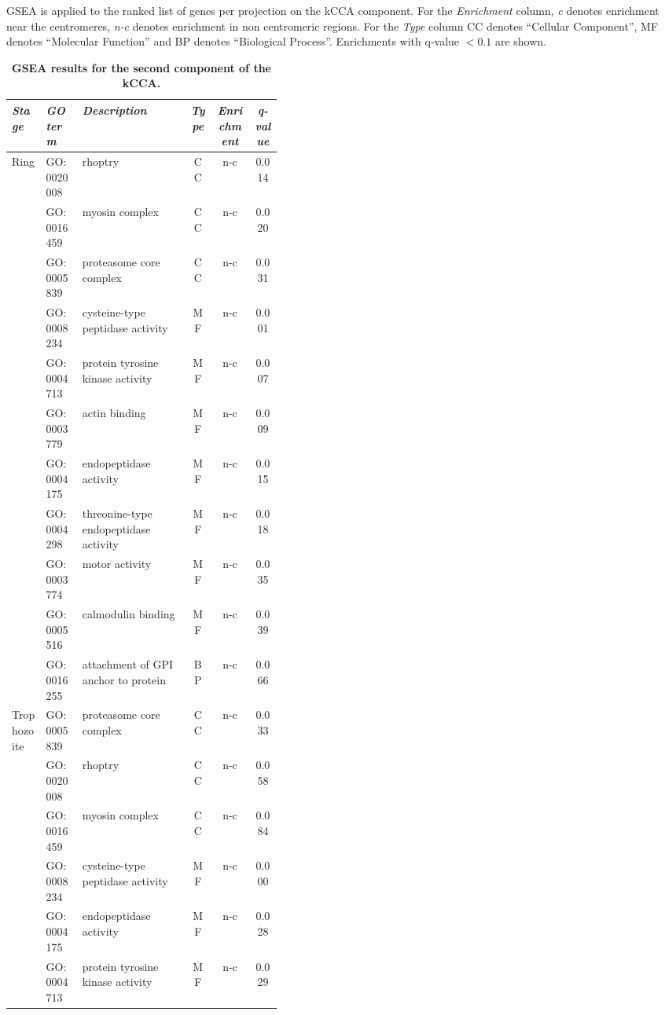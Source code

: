 \begin{table}
\caption{{\bf GSEA results for the second component of the kCCA.}}
{\normalsize GSEA is applied to the ranked list of genes per projection on the kCCA
component.
For the \emph{Enrichment} column, \emph{c} denotes enrichment near the
centromeres, \emph{n-c} denotes enrichment in non centromeric regions.
For the \emph{Type} column CC denotes ``Cellular Component'',
MF denotes ``Molecular Function'' and BP denotes ``Biological Process''.
Enrichments with q-value $< 0.1$ are shown.
}
\vspace{10pt}
\begin{center}
\begin{tabular}{llp{0.4\linewidth}ccc}
\hline
\emph{Stage} & \emph{GO term }&  \emph{Description} & \emph{Type} & \emph{Enrichment} & \emph{q-value}  \\
\hline
\multirow{11}{*}{Ring}
& GO:0020008 & rhoptry & CC & n-c & 0.014\\
& GO:0016459 & myosin complex & CC & n-c & 0.020\\
& GO:0005839 & proteasome core complex & CC & n-c & 0.031\\
& GO:0008234 & cysteine-type peptidase activity & MF  & n-c & 0.001\\
& GO:0004713 & protein tyrosine kinase activity & MF  & n-c & 0.007\\
& GO:0003779 & actin binding & MF  & n-c & 0.009\\
& GO:0004175 & endopeptidase activity & MF  & n-c & 0.015\\
& GO:0004298 & threonine-type endopeptidase activity & MF  & n-c & 0.018\\
& GO:0003774 & motor activity & MF  & n-c & 0.035\\
& GO:0005516 & calmodulin binding & MF  & n-c & 0.039\\
& GO:0016255 & attachment of GPI anchor to protein & BP & n-c & 0.066\\
\hline
\multirow{21}{*}{Trophozoite}
& GO:0005839 & proteasome core complex & CC & n-c & 0.033\\
& GO:0020008 & rhoptry & CC & n-c & 0.058\\
& GO:0016459 & myosin complex & CC & n-c & 0.084\\
& GO:0008234 & cysteine-type peptidase activity & MF  & n-c & 0.000\\
& GO:0004175 & endopeptidase activity & MF  & n-c & 0.028\\
& GO:0004713 & protein tyrosine kinase activity & MF  & n-c & 0.029\\

\end{tabular}
\end{center}
\end{table}
